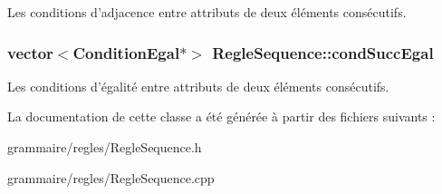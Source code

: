 Les conditions d'adjacence entre attributs de deux éléments consécutifs. 

\hypertarget{class_regle_sequence_aeb7ff397207904508a29b2f15c6841f1}{
\subsubsection[{cond\-Succ\-Egal}]{\setlength{\rightskip}{0pt plus 5cm}vector$<${\bf Condition\-Egal}$\ast$$>$ {\bf Regle\-Sequence\-::cond\-Succ\-Egal}}}\label{class_regle_sequence_aeb7ff397207904508a29b2f15c6841f1}


Les conditions d'égalité entre attributs de deux éléments consécutifs. 



La documentation de cette classe a été générée à partir des fichiers suivants \-:\begin{DoxyCompactItemize}
\item 
grammaire/regles/Regle\-Sequence.\-h\item 
grammaire/regles/Regle\-Sequence.\-cpp\end{DoxyCompactItemize}
